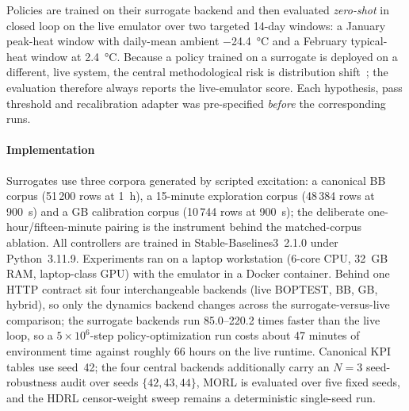 Policies are trained on their surrogate backend and then evaluated \emph{zero-shot} in closed loop
on the live emulator over two targeted 14-day windows: a January peak-heat window with daily-mean
ambient \SI{-24.4}{\celsius} and a February typical-heat window at \SI{+2.4}{\celsius}. Because a
policy trained on a surrogate is deployed on a different, live system, the central methodological
risk is distribution shift~\cite{Quinonero2009DatasetShift}; the evaluation therefore always reports
the live-emulator score. Each hypothesis, pass threshold and recalibration adapter was pre-specified
\emph{before} the corresponding runs.

\paragraph{Implementation}
Surrogates use three corpora generated by scripted excitation: a canonical BB corpus (51\,200 rows
at \SI{1}{\hour}), a 15-minute exploration corpus (48\,384 rows at \SI{900}{\second}) and a GB
calibration corpus (10\,744 rows at \SI{900}{\second}); the deliberate one-hour/fifteen-minute
pairing is the instrument behind the matched-corpus ablation. All controllers are trained in
Stable-Baselines3~2.1.0 under Python~3.11.9. Experiments ran on a laptop workstation (6-core CPU,
32~GB RAM, laptop-class GPU) with the emulator in a Docker container. Behind one HTTP contract sit
four interchangeable backends (live BOPTEST, BB, GB, hybrid), so only the dynamics backend changes
across the surrogate-versus-live comparison; the surrogate backends run \numrange{85.0}{220.2} times
faster than the live loop, so a $5\times10^6$-step policy-optimization run costs about 47 minutes of
environment time against roughly 66 hours on the live runtime. Canonical KPI tables use seed~42; the
four central backends additionally carry an $N=3$ seed-robustness audit over seeds
$\{42,43,44\}$, MORL is evaluated over five fixed seeds, and the HDRL censor-weight sweep remains a
deterministic single-seed run.
